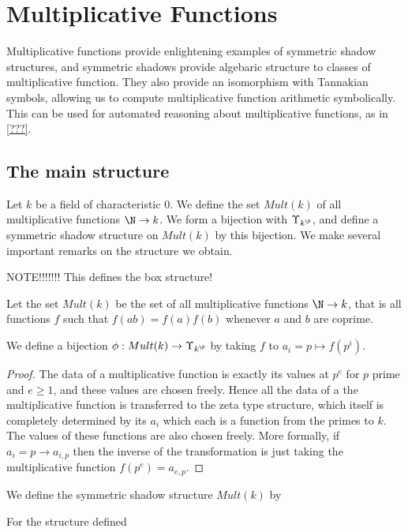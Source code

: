 \section{Multiplicative Functions}

Multiplicative functions provide enlightening examples of symmetric shadow structures, and symmetric shadows provide algebaric structure to classes of multiplicative function. They also provide an isomorphism with Tannakian symbols, allowing us to compute multiplicative function arithmetic symbolically. This can be used for automated reasoning about multiplicative functions, as in \ref{???}. 

\subsection{The main structure}

Let $k$ be a field of characteristic $0$. We define the set $Mult(k)$ of all multiplicative functions $\N \to k$. We form a bijection with $\Upsilon_{k^{\P}}$, and define a symmetric shadow structure on $Mult(k)$ by this bijection. We make several important remarks on the structure we obtain.

 NOTE!!!!!!! This defines the box structure!

\begin{definition}
    Let the set $Mult(k)$ be the set of all multiplicative functions $\N \to k$, that is all functions $f$ such that $f(ab) = f(a)f(b)$ whenever $a$ and $b$ are coprime.
\end{definition}

\begin{propdef}
    We define a bijection $\phi : Mult(k) \to \Upsilon_{k^{\P}}$ by taking $f$ to $a_i = p \mapsto f(p^i)$. 
\end{propdef}

\begin{proof}
    The data of a multiplicative function is exactly its values at $p^e$ for $p$ prime and $e \ge 1$, and these values are chosen freely. Hence all the data of a the multiplicative function is transferred to the zeta type structure, which itself is completely determined by its $a_i$ which each is a function from the primes to $k$. The values of these functions are also chosen freely. More formally, if $a_i = p \to a_{i, p}$ then the inverse of the transformation is just taking the multiplicative function $f(p^e) = a_{e, p}$. 
\end{proof}

\begin{definition}
    We define the symmetric shadow structure $Mult(k)$ by 
\end{definition}

\begin{theorem}
    For the structure defined 
\end{theorem}
